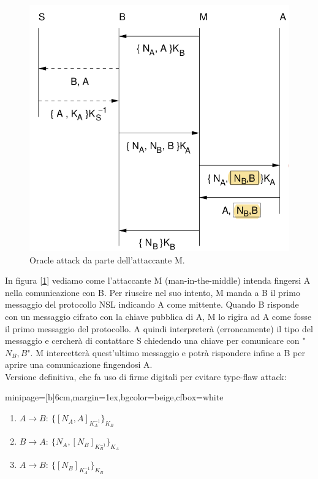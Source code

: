 \documentclass[a4paper, 11pt, notitlepage, fleqn]{report}
\newcommand{\fromto}[2]{#1\rightarrow #2\!:\ }
\newenvironment{colbox}[2]%
{%
	\par\noindent\hspace{10pt}
	\begin{adjustbox}{minipage=[b]{#2},margin=1ex,bgcolor=#1,cfbox=white}
}{%
	\end{adjustbox}\newline%
}
\begin{document}
\begin{figure}[htp]
	\centering
	\includegraphics[width=.8\textwidth]{images/OracleAttack}
	\caption{Oracle attack da parte dell'attaccante M.}\label{fig:oracle}
\end{figure}
\noindent In figura [\ref{fig:oracle}] vediamo come l'attaccante M (man-in-the-middle) intenda fingersi A nella comunicazione con B. Per riuscire nel suo intento, M manda a B il primo messaggio del protocollo NSL indicando A come mittente. Quando B risponde con un messaggio cifrato con la chiave pubblica di A, M lo rigira ad A come fosse il primo messaggio del protocollo. A quindi interpreterà (erroneamente) il tipo del messaggio e cercherà di contattare S chiedendo una chiave per comunicare con "$N_B,B$". M intercetterà quest'ultimo messaggio e potrà rispondere infine a B per aprire una comunicazione fingendosi A.\\
Versione definitiva, che fa uso di firme digitali per evitare type-flaw attack:
\begin{colbox}{beige}{6cm}
	\begin{enumerate}
		\item $\fromto{A}{B}\{[N_A,A]_{K_A^{-1}}\}_{K_B}$
		\item $\fromto{B}{A}\{N_A,[N_B]_{K_B^{-1}}\}_{K_A}$
		\item $\fromto{A}{B}\{[N_B]_{K_A^{-1}}\}_{K_B}$
	\end{enumerate}
\end{colbox}
\end{document}
